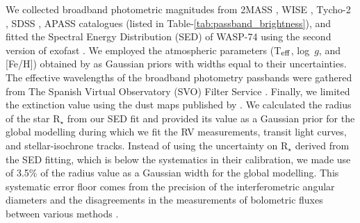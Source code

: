 \documentclass[a4paper,fleqn,usenatbib]{mnras}
\begin{document}
We collected broadband photometric magnitudes from 2MASS \citep{2003yCat.2246....0C}, WISE \citep{2012yCat.2311....0C}, Tycho-2 \citep{2000AA...355L..27H}, SDSS \citep{2015ApJS..219...12A}, APASS \citep{2015AAS...22533616H} catalogues (listed in Table-\ref{tab:passband_brightness}), and fitted the Spectral Energy Distribution (SED) of WASP-74 using the second version of {\sc exofast} \citep{2017ascl.soft10003E, 2019arXiv190709480E}. We employed the atmospheric parameters (T$_{\rm eff}$, log~$g$, and [Fe/H]) obtained by \citet{2018A&A...620A..58S} as Gaussian priors with widths equal to their uncertainties. The effective wavelengths of the broadband photometry passbands were gathered from The Spanish Virtual Observatory (SVO) Filter Service \citep{2012ivoa.rept.1015R, 2013hsa7.conf..953R}. Finally, we limited the extinction value using the dust maps published by \citet{1998ApJ...500..525S}. We calculated the radius of the star R$_{\star}$ from our SED fit and provided its value as a Gaussian prior for the global modelling during which we fit the RV measurements, transit light curves, and stellar-isochrone tracks. Instead of using the uncertainty on R$_{\star}$ derived from the SED fitting, which is below the systematics in their calibration, we made use of 3.5\% of the radius value as a Gaussian width for the global modelling. This systematic error floor comes from the precision of the interferometric angular diameters \citep{2018MNRAS.477.4403W} and the disagreements in the measurements of bolometric fluxes between various methods \citep{2019ApJ...885..166Z}.
\end{document}
